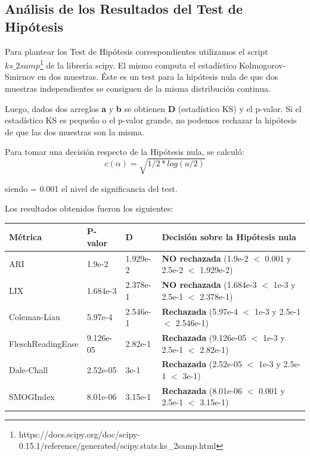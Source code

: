 \documentclass[12pt,journal,compsoc]{IEEEtran}
\begin{document}
\subsection{Análisis de los Resultados del Test de Hipótesis}

Para plantear los Test de Hipótesis correspondientes utilizamos el script $ks\_2samp$\footnote{https://docs.scipy.org/doc/scipy-0.15.1/reference/generated/scipy.stats.ks\_2samp.html} de la librería scipy. El mismo computa el estadístico Kolmogorov-Smirnov en dos muestras. Éste es un test para la hipótesis nula de que dos muestras independientes se consiguen de la misma distribución continua. 

Luego, dados dos arreglos \textbf{a} y \textbf{b} se obtienen \textbf{D} (estadístico KS) y el p-valor. Si el estadístico KS es pequeño o el p-valor grande, no podemos rechazar la hipótesis de que las dos muestras son la misma.

Para tomar una decisión respecto de la Hipótesis nula, se calculó:
$$c(\alpha) = \sqrt{1/2 * log(a/2)}$$

siendo \textit{\alpha} = 0.001 el nivel de significancia del test.

Los resultados obtenidos fueron los siguientes:\\

\begin{tabular}{ | l | l | l | l | }
\hline
Métrica & P-valor & D & Decisión sobre la Hipótesis nula\\
\hline
ARI & 1.9e-2 & 1.929e-2 & \textbf{NO rechazada} (1.9e-2 $<$ 0.001 y 2.5e-2 $<$ 1.929e-2)\\
\hline
LIX & 1.684e-3 & 2.378e-1 & \textbf{NO rechazada} (1.684e-3 $<$ 1e-3 y 2.5e-1 $<$ 2.378e-1)\\
\hline
Coleman-Liau & 5.97e-4 & 2.546e-1 & \textbf{Rechazada} (5.97e-4 $<$ 1e-3 y 2.5e-1 $<$ 2.546e-1)\\
\hline
FleschReadingEase & 9.126e-05 & 2.82e-1 & \textbf{Rechazada} (9.126e-05 $<$ 1e-3 y 2.5e-1 $<$ 2.82e-1)\\
\hline
Dale-Chall & 2.52e-05 & 3e-1 & \textbf{Rechazada} (2.52e-05 $<$ 1e-3 y 2.5e-1 $<$ 3e-1)\\
\hline
SMOGIndex & 8.01e-06 & 3.15e-1 & \textbf{Rechazada} (8.01e-06 $<$ 0.001 y 2.5e-1 $<$ 3.15e-1)\\
\hline
\end{tabular}
\end{document}
